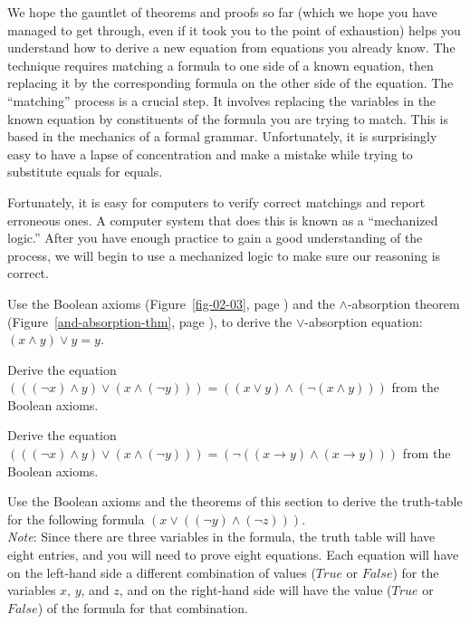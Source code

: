 We hope the gauntlet of theorems and proofs so far
(which we hope you have managed to get through,
even if it took you to the point of exhaustion)
helps you understand how to derive a new equation from equations you already know.
The technique requires matching a formula to one side of a known equation,
then replacing it by the corresponding formula on the other side
of the equation.
The
``matching'' process is a crucial step.
It involves replacing the variables in the known equation
by constituents of the formula you are trying to match.
This is based in the mechanics of a formal grammar.
Unfortunately, it is surprisingly easy
to have a lapse of concentration and make a mistake
while trying to substitute equals for equals.

Fortunately, it is easy for computers to verify
correct matchings and report erroneous ones.
A computer system that does this is known as a ``mechanized logic.''
After you have enough practice to gain a good understanding of the process,
we will begin to use a mechanized logic to make sure our reasoning is correct.

\begin{ExerciseList}
\Exercise
Use the Boolean axioms (Figure~\ref{fig-02-03}, page \pageref{fig-02-03})
and the $\wedge$-absorption theorem
(Figure~\ref{and-absorption-thm}, page \pageref{and-absorption-thm}),
to derive the $\vee$-absorption equation: $(x \wedge y) \vee y = y$.

\Exercise
Derive the equation
$(((\neg x) \wedge y) \vee (x \wedge (\neg y))) = ((x \vee y) \wedge (\neg(x \wedge y)))$
from the Boolean axioms.

\Exercise
Derive the equation
$(((\neg x) \wedge y) \vee (x \wedge (\neg y))) = (\neg((x \rightarrow y) \wedge (x \rightarrow y)))$
from the Boolean axioms.

\Exercise
Use the Boolean axioms
and the theorems of this section to
derive the truth-table for the following formula $(x \vee ((\neg y) \wedge (\neg z)))$.\\
\emph{Note}: Since there are three variables in the formula, the truth table
will have eight entries, and you will need to prove eight equations.
Each equation will have on the left-hand side
a different combination of values ($True$ or $False$) for the variables $x$, $y$, and $z$,
and on the right-hand side will have the value ($True$ or $False$) of the formula for that combination.
\end{ExerciseList}

